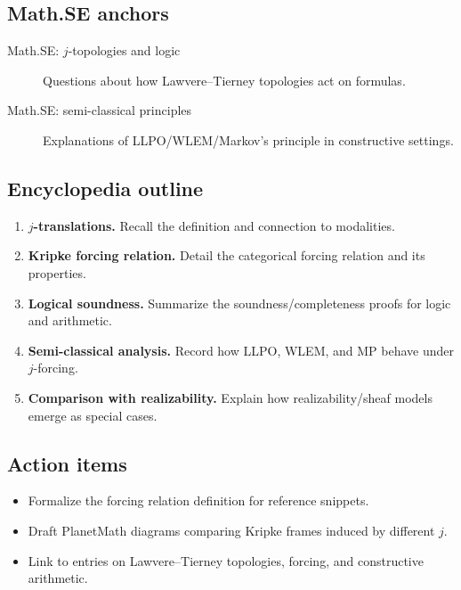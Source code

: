 \subsection*{Math.SE anchors}
\begin{description}
  \item[Math.SE: $j$-topologies and logic] Questions about how Lawvere--Tierney topologies act on formulas.
  \item[Math.SE: semi-classical principles] Explanations of LLPO/WLEM/Markov's principle in constructive settings.
\end{description}
\subsection*{Encyclopedia outline}
\begin{enumerate}
  \item \textbf{$j$-translations.} Recall the definition and connection to modalities.
  \item \textbf{Kripke forcing relation.} Detail the categorical forcing relation and its properties.
  \item \textbf{Logical soundness.} Summarize the soundness/completeness proofs for logic and arithmetic.
  \item \textbf{Semi-classical analysis.} Record how LLPO, WLEM, and MP behave under $j$-forcing.
  \item \textbf{Comparison with realizability.} Explain how realizability/sheaf models emerge as special cases.
\end{enumerate}
\subsection*{Action items}
\begin{itemize}
  \item Formalize the forcing relation definition for reference snippets.
  \item Draft PlanetMath diagrams comparing Kripke frames induced by different $j$.
  \item Link to entries on Lawvere--Tierney topologies, forcing, and constructive arithmetic.
\end{itemize}
